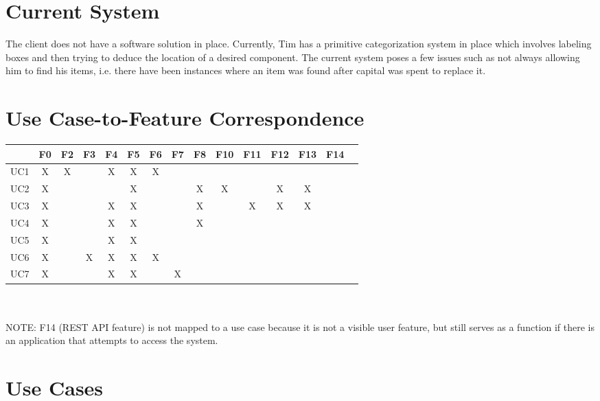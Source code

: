 \documentclass{article}
\begin{document}
\section{Current System}
The client does not have a software solution in place.  Currently, Tim has a primitive categorization system in place which involves labeling boxes and then trying to deduce the location of a desired component.  The current system poses a few issues such as not always allowing him to find his items, i.e. there have been instances where an item was found after capital was spent to replace it.

\section{Use Case-to-Feature Correspondence}
\begin{tabular}{ | c || c | c | c | c | c | c | c | c | c | c | c | c | c | c | }
\hline
    & F0 & F2 & F3 & F4 & F5 & F6 & F7 & F8 & F10 & F11 & F12 & F13 & F14 \\
\hline
\hline
UC1  &  X &  X &    &  X &  X &  X &    &    &    &    &    &    &    \\
\hline
UC2  &  X &    &    &    &  X &    &    &  X &  X &    &  X &  X &    \\
\hline
UC3  &  X &    &    &  X &  X &    &    &  X &    &  X &  X &  X &    \\
\hline
UC4  &  X &    &    &  X &  X &    &    &  X &    &    &    &    &    \\
\hline
UC5  &  X &    &    &  X &  X &    &    &    &    &    &    &    &    \\
\hline
UC6  &  X &    &  X &  X &  X &  X &    &    &    &    &    &    &    \\
\hline
UC7  &  X &    &    &  X &  X &    &  X &    &    &    &    &    &    \\
\hline
\end{tabular}\\ \\
NOTE: F14 (REST API feature) is not mapped to a use case because it is not a visible user feature, but still serves as a function if there is an application that attempts to access the system.

\section{Use Cases}
\label{use_case}
\end{document}
